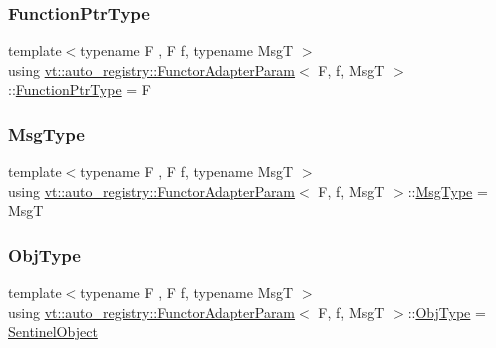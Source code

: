 \subsubsection{\texorpdfstring{Function\+Ptr\+Type}{FunctionPtrType}}
{\footnotesize\ttfamily template$<$typename F , F f, typename MsgT $>$ \\
using \hyperlink{structvt_1_1auto__registry_1_1_functor_adapter_param}{vt\+::auto\+\_\+registry\+::\+Functor\+Adapter\+Param}$<$ F, f, MsgT $>$\+::\hyperlink{structvt_1_1auto__registry_1_1_functor_adapter_param_a265b01cc62bfbdd828d8e69d98391577}{Function\+Ptr\+Type} =  F}

\mbox{\label{structvt_1_1auto__registry_1_1_functor_adapter_param_a6c3d915609c4370031f476b323965d2d}} 
\subsubsection{\texorpdfstring{Msg\+Type}{MsgType}}
{\footnotesize\ttfamily template$<$typename F , F f, typename MsgT $>$ \\
using \hyperlink{structvt_1_1auto__registry_1_1_functor_adapter_param}{vt\+::auto\+\_\+registry\+::\+Functor\+Adapter\+Param}$<$ F, f, MsgT $>$\+::\hyperlink{structvt_1_1auto__registry_1_1_functor_adapter_param_a6c3d915609c4370031f476b323965d2d}{Msg\+Type} =  MsgT}

\mbox{\label{structvt_1_1auto__registry_1_1_functor_adapter_param_a8a1e0cb0c823a95322a4a16b65a41d6f}} 
\subsubsection{\texorpdfstring{Obj\+Type}{ObjType}}
{\footnotesize\ttfamily template$<$typename F , F f, typename MsgT $>$ \\
using \hyperlink{structvt_1_1auto__registry_1_1_functor_adapter_param}{vt\+::auto\+\_\+registry\+::\+Functor\+Adapter\+Param}$<$ F, f, MsgT $>$\+::\hyperlink{structvt_1_1auto__registry_1_1_functor_adapter_param_a8a1e0cb0c823a95322a4a16b65a41d6f}{Obj\+Type} =  \hyperlink{structvt_1_1auto__registry_1_1_sentinel_object}{Sentinel\+Object}}



